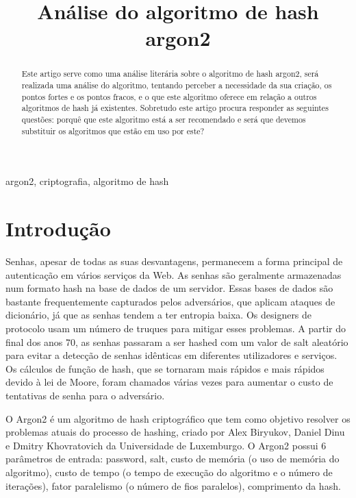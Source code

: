 \documentclass[conference]{IEEEtran}
\begin{document}
\title{Análise do algoritmo de hash argon2\\
}

\author{
}

\maketitle

\begin{abstract}
Este artigo serve como uma análise literária sobre o algoritmo de hash
argon2, será realizada uma análise do algoritmo, tentando perceber a necessidade
da sua criação, os pontos fortes e os pontos fracos, e o que este algoritmo
oferece em relação a outros algoritmos de hash já existentes. Sobretudo este artigo
procura responder as seguintes questões: porquê que este algoritmo está a ser
recomendado e será que devemos substituir os algoritmos que estão em uso por este?
\end{abstract}

\begin{IEEEkeywords}
argon2, criptografia, algoritmo de hash
\end{IEEEkeywords}

\section{Introdução}
Senhas, apesar de todas as suas desvantagens, permanecem a forma 
principal de autenticação em vários serviços da Web. 
As senhas são geralmente armazenadas num formato hash na base de dados 
de um servidor. Essas bases de dados são bastante frequentemente capturados 
pelos adversários, que aplicam ataques de dicionário, já que as senhas 
tendem a ter entropia baixa. Os designers de protocolo usam um número de 
truques para mitigar esses problemas. A partir do final dos anos 70, as 
senhas passaram a ser hashed com um valor de salt aleatório para evitar a 
detecção de senhas idênticas em diferentes utilizadores e serviços. Os 
cálculos de função de hash, que se tornaram mais rápidos e mais rápidos 
devido à lei de Moore, foram chamados várias vezes para aumentar o custo 
de tentativas de senha para o adversário. \cite{argon2spec}

O Argon2 é um algoritmo de hash criptográfico que tem como objetivo resolver 
os problemas atuais do processo de hashing, criado por Alex Biryukov, 
Daniel Dinu e Dmitry Khovratovich da Universidade de Luxemburgo. O Argon2 
possui 6 parâmetros de entrada: password, salt, custo de memória (o uso de 
memória do algoritmo), custo de tempo (o tempo de execução do algoritmo e o 
número de iterações), fator paralelismo (o número de fios paralelos), 
comprimento da hash.
\end{document}
